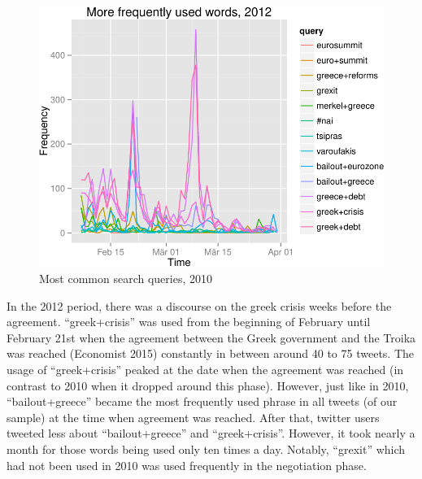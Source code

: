 \documentclass[]{article}
\begin{document}
\begin{figure}

{\centering \includegraphics{fin_paper_files/figure-latex/unnamed-chunk-9-1} 

}

\caption{Most common search queries, 2010}\label{fig:unnamed-chunk-9}
\end{figure}

In the 2012 period, there was a discourse on the greek crisis weeks
before the agreement. ``greek+crisis'' was used from the beginning of
February until February 21st when the agreement between the Greek
government and the Troika was reached (Economist 2015) constantly in
between around 40 to 75 tweets. The usage of ``greek+crisis'' peaked at
the date when the agreement was reached (in contrast to 2010 when it
dropped around this phase). However, just like in 2010,
``bailout+greece'' became the most frequently used phrase in all tweets
(of our sample) at the time when agreement was reached. After that,
twitter users tweeted less about ``bailout+greece'' and
``greek+crisis''. However, it took nearly a month for those words being
used only ten times a day. Notably, ``grexit'' which had not been used
in 2010 was used frequently in the negotiation phase.
\end{document}
